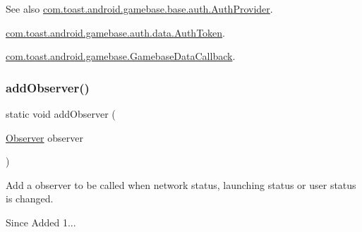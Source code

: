 \begin{DoxySeeAlso}{See also}
\hyperlink{interfacecom_1_1toast_1_1android_1_1gamebase_1_1base_1_1auth_1_1_auth_provider}{com.\+toast.\+android.\+gamebase.\+base.\+auth.\+Auth\+Provider}. 

\hyperlink{classcom_1_1toast_1_1android_1_1gamebase_1_1auth_1_1data_1_1_auth_token}{com.\+toast.\+android.\+gamebase.\+auth.\+data.\+Auth\+Token}. 

\hyperlink{interfacecom_1_1toast_1_1android_1_1gamebase_1_1_gamebase_data_callback}{com.\+toast.\+android.\+gamebase.\+Gamebase\+Data\+Callback}. 
\end{DoxySeeAlso}
\mbox{\label{classcom_1_1toast_1_1android_1_1gamebase_1_1_gamebase_a9079ec835df5660d8b19a1fd3eb0d9d8}} 
\subsubsection{\texorpdfstring{add\+Observer()}{addObserver()}}
{\footnotesize\ttfamily static void add\+Observer (\begin{DoxyParamCaption}\item[{\hyperlink{interfacecom_1_1toast_1_1android_1_1gamebase_1_1observer_1_1_observer}{Observer}}]{observer }\end{DoxyParamCaption})\hspace{0.3cm}{\ttfamily [static]}}



Add a observer to be called when network status, launching status or user status is changed. 

\begin{DoxySince}{Since}
Added 1... 
\end{DoxySince}


